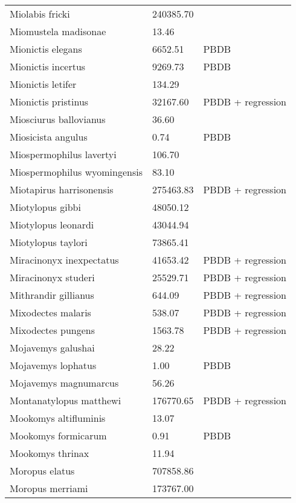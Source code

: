 \documentclass{article}
\begin{document}
\begin{center}
\begin{longtable}{p{} p{} p{}}
    Miolabis fricki & 240385.70 & \cite{Tomiya2013} \\ 
    Miomustela madisonae & 13.46 & \cite{Tomiya2013} \\ 
    Mionictis elegans & 6652.51 & PBDB \\ 
    Mionictis incertus & 9269.73 & PBDB \\ 
    Mionictis letifer & 134.29 & \cite{Tomiya2013} \\ 
    Mionictis pristinus & 32167.60 & PBDB + regression \\ 
    Miosciurus ballovianus & 36.60 & \cite{Tomiya2013} \\ 
    Miosicista angulus & 0.74 & PBDB \\ 
    Miospermophilus lavertyi & 106.70 & \cite{Tomiya2013} \\ 
    Miospermophilus wyomingensis & 83.10 & \cite{Tomiya2013} \\ 
    Miotapirus harrisonensis & 275463.83 & PBDB + regression \\ 
    Miotylopus gibbi & 48050.12 & \cite{Tomiya2013} \\ 
    Miotylopus leonardi & 43044.94 & \cite{Tomiya2013} \\ 
    Miotylopus taylori & 73865.41 & \cite{Tomiya2013} \\ 
    Miracinonyx inexpectatus & 41653.42 & PBDB + regression \\ 
    Miracinonyx studeri & 25529.71 & PBDB + regression \\ 
    Mithrandir gillianus & 644.09 & PBDB + regression \\ 
    Mixodectes malaris & 538.07 & PBDB + regression \\ 
    Mixodectes pungens & 1563.78 & PBDB + regression \\ 
    Mojavemys galushai & 28.22 & \cite{Tomiya2013} \\ 
    Mojavemys lophatus & 1.00 & PBDB \\ 
    Mojavemys magnumarcus & 56.26 & \cite{Tomiya2013} \\ 
    Montanatylopus matthewi & 176770.65 & PBDB + regression \\ 
    Mookomys altifluminis & 13.07 & \cite{Tomiya2013} \\ 
    Mookomys formicarum & 0.91 & PBDB \\ 
    Mookomys thrinax & 11.94 & \cite{Tomiya2013} \\ 
    Moropus elatus & 707858.86 & \cite{Tomiya2013} \\ 
    Moropus merriami & 173767.00 & \cite{McKenna2011} \\ 

\end{longtable}
\end{center}
\end{document}
